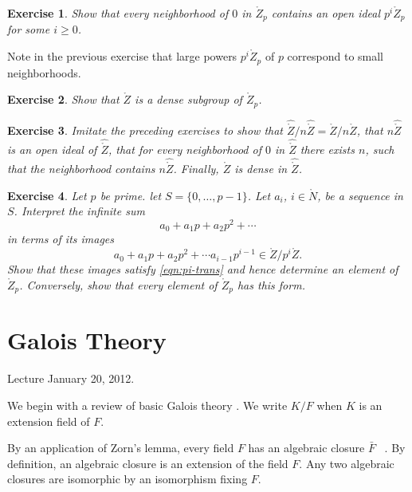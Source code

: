 \documentclass{amsart}
\newtheorem{exercise}{Exercise}
\begin{document}
\begin{exercise}\label{ex:open-ideal}  
Show that every neighborhood of $0$ in $\ring{Z}_p$ contains
an open ideal $p^i\ring{Z}_p$ for some $i\ge 0$.
\end{exercise}


Note in the previous exercise that large powers $p^i\ring{Z}_p$ of $p$ correspond to
small neighborhoods.


\begin{exercise} Show that $\ring{Z}$ is a dense subgroup of $\ring{Z}_p$. 
\end{exercise}


\begin{exercise} Imitate the preceding exercises to show that
$\hat{\ring{Z}}/n\hat{\ring{Z}} = \ring{Z}/n\ring{Z}$, that $n\hat{\ring{Z}}$
is an open ideal of $\hat{\ring{Z}}$, that for every neighborhood of $0$ in
$\hat{\ring{Z}}$ there exists $n$, such that the
neighborhood contains $n\hat{\ring{Z}}$.  Finally, $\ring{Z}$ is dense
in  $\hat{\ring{Z}}$.
\end{exercise}




\begin{exercise} Let $p$ be prime.  let $S = \{0,\ldots,p-1\}$.
Let $a_i$, $i\in\ring{N}$, be a sequence in $S$.  Interpret the infinite sum
\[
a_0 + a_1 p + a_2 p^2 +\cdots
\]
in terms of its images
\[
a_0 + a_1p + a_2p^2 +\cdots a_{i-1}p^{i-1} \in \ring{Z}/p^i\ring{Z}.
\]
Show that these images satisfy \eqref{eqn:pi-trans} and hence determine an element
of $\ring{Z}_p$.  Conversely, show that every element of $\ring{Z}_p$ has this form.
\end{exercise}



\newpage

\section{Galois Theory}

Lecture January 20, 2012.

We begin with a review of basic Galois theory \cite[Chapter IX]{knapp-basic}.  
We write $K/F$ when $K$ is an extension field of $F$.

By an application of Zorn's lemma, every field $F$ has an algebraic closure
$\bar F$ ~\cite[page 461]{knapp-basic}.  By definition, an algebraic closure
is an extension of the field $F$.
Any two algebraic closures are isomorphic by an isomorphism fixing $F$.
\end{document}

